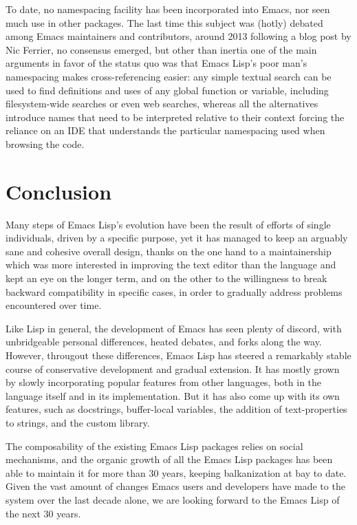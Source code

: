 \documentclass[format=acmsmall, review]{acmart}
\newcommand \Elisp {Emacs Lisp}
\begin{document}
To date, no namespacing facility has been incorporated into Emacs, nor seen
much use in other packages.  The last time this subject was (hotly) debated
among Emacs maintainers and contributors, around 2013 following a blog post
by Nic Ferrier, no consensus emerged, but other than inertia one of the
main arguments in favor of the status quo was that \Elisp's poor man's
namespacing makes cross-referencing easier: any simple textual search can be
used to find definitions and uses of any global function or variable,
including filesystem-wide searches or even web searches,
whereas all the alternatives introduce names that need to be interpreted
relative to their context forcing the reliance on an IDE that understands the
particular namespacing used when browsing the code.



\section{Conclusion}
\label{sec:conclusion}

Many steps of \Elisp's evolution have been the result of efforts of single
individuals, driven by a specific purpose, yet it has managed to keep an
arguably sane and cohesive overall design, thanks on the one hand to
a maintainership which was more interested in improving the text editor than
the language and kept an eye on the longer term, and on the other to the
willingness to break backward compatibility in specific cases, in order to
gradually address problems encountered over time.

Like Lisp in general, the development of Emacs has seen plenty of
discord, with unbridgeable personal differences, heated debates, and
forks along the way.  However, througout these differences, \Elisp{}
has steered a remarkably stable course of conservative development and
gradual extension.  It has mostly grown by slowly incorporating popular
features from other languages, both in the language itself and in its
implementation.  But it has also come up with its own features, such as
docstrings, buffer-local variables, the addition of text-properties
to strings, and the custom library.

The composability of the existing \Elisp{} packages relies on social
mechanisms, and the organic growth of all the \Elisp{} packages has
been able to maintain it for more than 30 years, keeping balkanization
at bay to date.  Given the vast amount of changes Emacs users and
developers have made to the system over the last decade alone, we are
looking forward to the \Elisp{} of the next 30 years.
\end{document}
